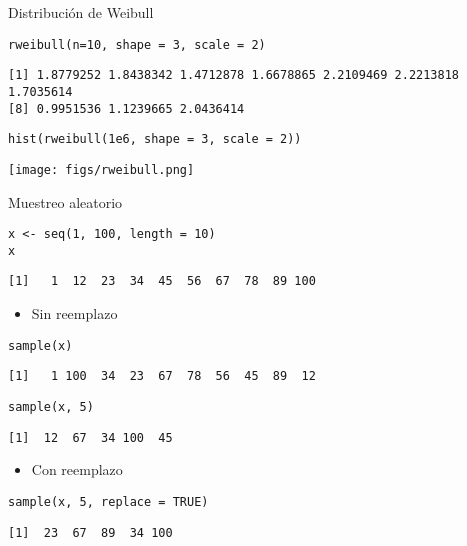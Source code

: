 \documentclass[xcolor={usenames,svgnames,dvipsnames}]{beamer}
\begin{document}
\begin{frame}[fragile,label={sec:org2c74955}]{Distribución de Weibull}
 \lstset{language=r,label= ,caption= ,captionpos=b,numbers=none}
\begin{lstlisting}
rweibull(n=10, shape = 3, scale = 2)
\end{lstlisting}

\begin{verbatim}
[1] 1.8779252 1.8438342 1.4712878 1.6678865 2.2109469 2.2213818 1.7035614
[8] 0.9951536 1.1239665 2.0436414
\end{verbatim}


\lstset{language=r,label= ,caption= ,captionpos=b,numbers=none}
\begin{lstlisting}
hist(rweibull(1e6, shape = 3, scale = 2))
\end{lstlisting}

\begin{center}
\texttt{[image: figs/rweibull.png]}
\end{center}
\end{frame}

\begin{frame}[fragile,label={sec:orgf2b0814}]{Muestreo aleatorio}
 \lstset{language=r,label= ,caption= ,captionpos=b,numbers=none}
\begin{lstlisting}
x <- seq(1, 100, length = 10)
x
\end{lstlisting}

\begin{verbatim}
[1]   1  12  23  34  45  56  67  78  89 100
\end{verbatim}

\begin{itemize}
\item Sin reemplazo
\end{itemize}
\lstset{language=r,label= ,caption= ,captionpos=b,numbers=none}
\begin{lstlisting}
sample(x)
\end{lstlisting}

\begin{verbatim}
[1]   1 100  34  23  67  78  56  45  89  12
\end{verbatim}

\lstset{language=r,label= ,caption= ,captionpos=b,numbers=none}
\begin{lstlisting}
sample(x, 5)
\end{lstlisting}

\begin{verbatim}
[1]  12  67  34 100  45
\end{verbatim}

\begin{itemize}
\item Con reemplazo
\end{itemize}
\lstset{language=r,label= ,caption= ,captionpos=b,numbers=none}
\begin{lstlisting}
sample(x, 5, replace = TRUE)
\end{lstlisting}

\begin{verbatim}
[1]  23  67  89  34 100
\end{verbatim}
\end{frame}
\end{document}
